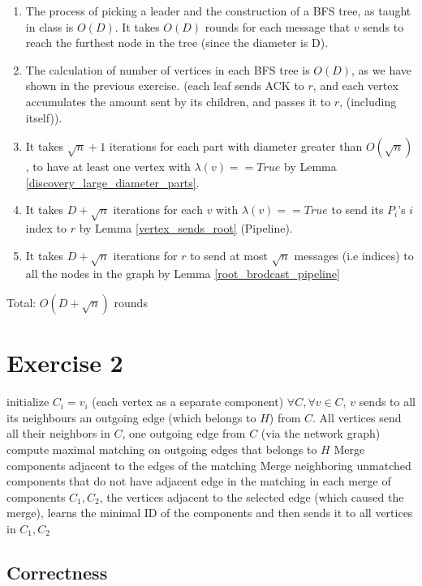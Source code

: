 \documentclass[11pt]{article}
\begin{document}
\begin{enumerate}
    \item The process of picking a leader and the construction of a BFS tree, as taught in class is $O(D)$. It takes $O(D)$ rounds for each message that $v$ sends to reach the furthest node in the tree (since the diameter is D). 
    \item The calculation of number of vertices in each BFS tree is $O(D)$, as we have shown in the previous exercise. (each leaf sends ACK to $r$, and each vertex accumulates the amount sent by its children, and passes it to $r$, (including itself)).
   \item It takes $\sqrt{n} +1$ iterations for each part with diameter greater than $O(\sqrt{n})$, to have at least one vertex with $\lambda(v) == True$ by Lemma \ref{discovery_large_diameter_parts}.
   \item It takes $D + \sqrt{n}$ iterations for each $v \text{ with } \lambda(v) == True$ to send its $P_i$'s $i$ index to $r$ by Lemma \ref{vertex_sends_root} (Pipeline).
   \item It takes $D + \sqrt{n}$ iterations for $r$ to send at most $\sqrt{n}$ messages (i.e indices) to all the nodes in the graph by Lemma \ref{root_brodcast_pipeline}
\end{enumerate}
Total: $O(D + \sqrt{n})$ rounds

\section{Exercise 2}
\begin{algorithmic}[1]
\State initialize $C_i = {v_i}$ (each vertex as a separate component)
    \State $\forall C, \forall v\in C$, $v$ sends to all its neighbours an outgoing edge (which belongs to $H$) from $C$.
    \State All vertices send all their neighbors in $C$, one outgoing edge from $C$ (via the network graph)
    \State compute maximal matching on outgoing edges that belongs to $H$
    \State Merge components adjacent to the edges of the matching
    \State Merge neighboring unmatched components that do not have adjacent edge in the matching
    \State in each merge of components $C_1, C_2$, the vertices adjacent to the selected edge (which caused the merge), learns the minimal ID of the components and then sends it to all vertices in $C_1, C_2$
    \EndWhile
\end{algorithmic}

\subsection*{Correctness}
\end{document}

